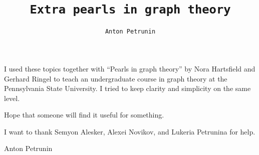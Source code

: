 \title{\tt Extra pearls in graph theory}
\author{\tt Anton Petrunin}
\date{}
\maketitle

I used these topics together with ``Pearls in graph theory'' by Nora Hartsfield and Gerhard Ringel \cite{hartsfield-ringel} to teach an undergraduate course in graph theory at the Pennsylvania State University.
I tried to keep clarity and simplicity on the same level.

Hope that someone will find it useful for something.

\medskip

I want to thank 
Semyon Alesker,
Alexei Novikov,
and Lukeria Petrunina for help.

\begin{flushright}
Anton Petrunin
\end{flushright}

\null\vfill{}


\thispagestyle{empty}
\newpage
\tableofcontents
